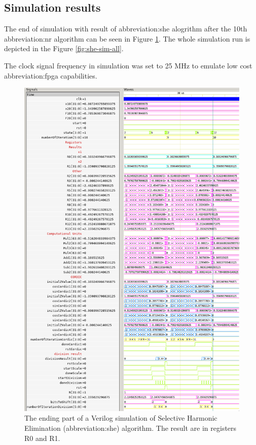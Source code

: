 \documentclass[a4paper, twoside, 11pt]{article}
\begin{document}
    \subsection{Simulation results}
        The end of simulation with result of \gls{abbreviation:she} alogrithm after the 10th \gls{abbreviation:nr} algorithm can be seen in Figure \ref{fig:she-sim-end}. The whole simulation run is depicted in the Figure \ref{fig:she-sim-all}.\par
        The clock signal frequency in simulation was set to 25 MHz to emulate low cost \gls{abbreviation:fpga} capabilities.
            \begin{figure}[htbp!]
                \centering
                \includegraphics[width=1\textwidth]{src/png/inverted/she-sim-end.png}
                \caption{The ending part of a Verilog simulation of Selective Harmonic Elimination (\gls{abbreviation:she}) algorithm. The result are in registers R0 and R1.}
                \label{fig:she-sim-end}
            \end{figure}
\end{document}
